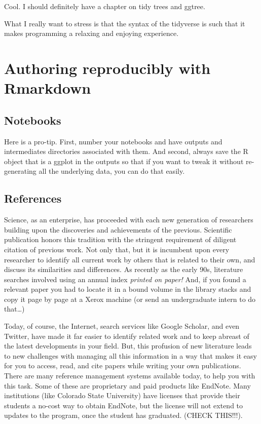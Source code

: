 \documentclass[]{krantz}
\begin{document}
Cool. I should definitely have a chapter on tidy trees and ggtree.

What I really want to stress is that the syntax of the tidyverse is such
that it makes programming a relaxing and enjoying experience.

\hypertarget{authoring-reproducibly-with-rmarkdown}{%
\chapter{Authoring reproducibly with Rmarkdown}\label{authoring-reproducibly-with-rmarkdown}}

\hypertarget{notebooks}{%
\section{Notebooks}\label{notebooks}}

Here is a pro-tip. First, number your notebooks and have outputs and intermediates directories
associated with them. And second, always save the R object that is a ggplot in the outputs so that if
you want to tweak it without re-generating all the underlying data, you can do that easily.

\hypertarget{references}{%
\section{References}\label{references}}

Science, as an enterprise, has proceeded with each new generation of researchers building
upon the discoveries and achievements of the previous. Scientific publication honors this
tradition with the stringent requirement of diligent citation of previous work. Not only
that, but it is incumbent upon every researcher to identify all current work by others that
is related to their own, and discuss its similarities and differences. As recently as the early
90s, literature searches involved using an annual index \emph{printed on paper!} And, if you found
a relevant paper you had to locate it in a bound volume in the library stacks and copy it page by page
at a Xerox machine (or send an undergraduate intern to do that\ldots{})

Today, of course, the Internet, search services like Google Scholar, and even Twitter,
have made it far easier to identify related work and to keep abreast of the latest
developments in your field. But, this profusion of new literature leads to new challenges
with managing all this information in a way that makes it easy for you to access, read, and
cite papers while writing your own publications. There are many reference management
systems available today, to help you with this task. Some of these are proprietary and paid
products like EndNote. Many institutions (like Colorado State University) have licenses that provide
their students a no-cost way to obtain EndNote, but the license will not extend to updates to
the program, once the student has graduated. (CHECK THIS!!!).
\end{document}

